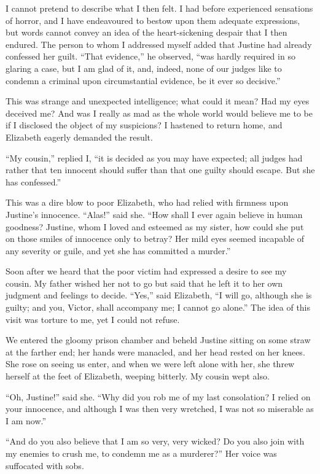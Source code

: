 \documentclass[12pt,openright]{book}
\begin{document}
I cannot pretend to describe what I then felt. I had before experienced sensations of horror, and I have endeavoured to bestow upon them adequate expressions, but words cannot convey an idea of the heart-sickening despair that I then endured. The person to whom I addressed myself added that Justine had already confessed her guilt. “That evidence,” he observed, “was hardly required in so glaring a case, but I am glad of it, and, indeed, none of our judges like to condemn a criminal upon circumstantial evidence, be it ever so decisive.”

This was strange and unexpected intelligence; what could it mean? Had my eyes deceived me? And was I really as mad as the whole world would believe me to be if I disclosed the object of my suspicions? I hastened to return home, and Elizabeth eagerly demanded the result.

“My cousin,” replied I, “it is decided as you may have expected; all judges had rather that ten innocent should suffer than that one guilty should escape. But she has confessed.”

This was a dire blow to poor Elizabeth, who had relied with firmness upon Justine’s innocence. “Alas!” said she. “How shall I ever again believe in human goodness? Justine, whom I loved and esteemed as my sister, how could she put on those smiles of innocence only to betray? Her mild eyes seemed incapable of any severity or guile, and yet she has committed a murder.”

Soon after we heard that the poor victim had expressed a desire to see my cousin. My father wished her not to go but said that he left it to her own judgment and feelings to decide. “Yes,” said Elizabeth, “I will go, although she is guilty; and you, Victor, shall accompany me; I cannot go alone.” The idea of this visit was torture to me, yet I could not refuse.

We entered the gloomy prison chamber and beheld Justine sitting on some straw at the farther end; her hands were manacled, and her head rested on her knees. She rose on seeing us enter, and when we were left alone with her, she threw herself at the feet of Elizabeth, weeping bitterly. My cousin wept also.

“Oh, Justine!” said she. “Why did you rob me of my last consolation? I relied on your innocence, and although I was then very wretched, I was not so miserable as I am now.”

“And do you also believe that I am so very, very wicked? Do you also join with my enemies to crush me, to condemn me as a murderer?” Her voice was suffocated with sobs.
\end{document}
